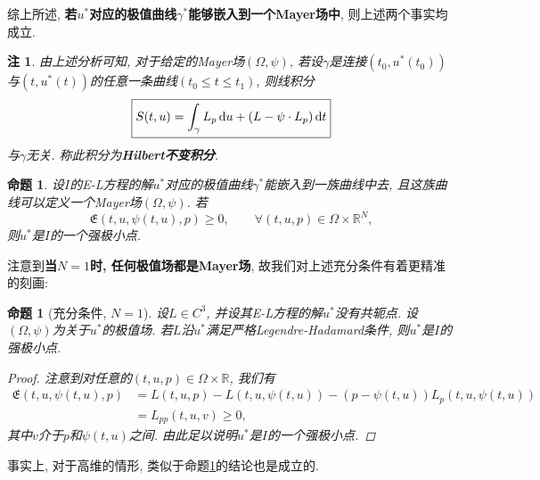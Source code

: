 \documentclass[12pt,a4paper]{article}
\newtheorem{proposition}[theorem]{命题}
\newtheorem{remark}[theorem]{注}
\begin{document}
综上所述, \textbf{若$u^*$对应的极值曲线$\gamma^*$能够嵌入到一个Mayer场中}, 则上述两个事实均成立.

\begin{remark}
    由上述分析可知, 对于给定的Mayer场$(\Omega, \psi)$, 若设$\gamma$是连接$(t_0, u^*(t_0))$与$(t, u^*(t))$的任意一条曲线$(t_0 \leq t \leq t_1)$, 则线积分 
    \begin{equation*}
        \boxed{S(t, u) = \int_{\gamma}L_p \,{\rm d}u + (L - \psi \cdot L_p) \,{\rm d}t}
    \end{equation*}
    与$\gamma$无关. 称此积分为\textbf{Hilbert不变积分}.
\end{remark}

\begin{proposition}
    设$I$的E-L方程的解$u^*$对应的极值曲线$\gamma^*$能嵌入到一族曲线中去, 且这族曲线可以定义一个Mayer场$(\Omega, \psi)$.
    若
    \begin{equation*}
        \mathfrak{E}(t, u, \psi(t, u), p) \geq 0, \qquad \forall (t, u, p) \in \Omega \times \mathbb{R}^N,
    \end{equation*}
    则$u^*$是$I$的一个强极小点.
\end{proposition}

注意到\textbf{当$N = 1$时, 任何极值场都是Mayer场}, 故我们对上述充分条件有着更精准的刻画:

\begin{proposition}[充分条件, $N = 1$]\label{prop1.30}
    设$L \in C^3$, 并设其E-L方程的解$u^*$没有共轭点. 设$(\Omega, \psi)$为关于$u^*$的极值场.
    若$L$沿$u^*$满足严格Legendre-Hadamard条件, 则$u^*$是$I$的强极小点.
    \begin{proof}
        注意到对任意的$(t, u, p) \in \Omega \times \mathbb{R}$, 我们有 
        \begin{align*}
            \mathfrak{E}(t, u, \psi(t, u), p) &= L(t, u, p) - L(t, u, \psi(t, u)) - (p - \psi(t, u))L_p(t, u, \psi(t, u)) \\   
            &= L_{pp}(t, u, v) \geq 0, 
        \end{align*}
        其中$v$介于$p$和$\psi(t, u)$之间. 由此足以说明$u^*$是$I$的一个强极小点.
    \end{proof}
\end{proposition}

事实上, 对于高维的情形, 类似于命题\ref{prop1.30}的结论也是成立的.
\end{document}
